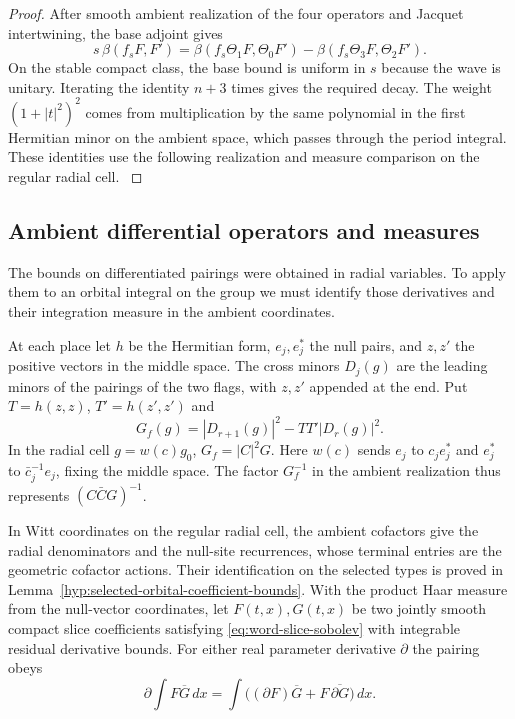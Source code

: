\begin{proof}
After smooth ambient realization of the four operators
and Jacquet intertwining, the base adjoint gives
\[
  s\,\beta(f_s F,F')
   =\beta(f_s\Theta_1 F,\Theta_0 F')
        -\beta(f_s\Theta_3 F,\Theta_2 F').
\]
On the stable compact class, the base bound is uniform in
\(s\) because the wave is unitary. Iterating the identity
\(n+3\) times gives the required decay. The weight
\((1+|t|^2)^2\) comes from multiplication by the same
polynomial in the first Hermitian minor on the ambient
space, which passes through the period integral.
These identities use the following realization and measure
comparison on the regular radial cell. \label{cor:word-pairing-3}

\end{proof}

\subsection{Ambient differential operators and measures}

The bounds on differentiated pairings were obtained in radial variables. To apply them to an orbital integral on the group we must identify those derivatives and their integration measure in the ambient coordinates.

At each place let \(h\) be the Hermitian form, \(e_j,e_j^*\)
the null pairs, and \(z,z'\) the positive vectors in the
middle space. The cross minors \(D_j(g)\) are the leading
minors of the pairings of the two flags, with \(z,z'\)
appended at the end. Put \(T=h(z,z)\), \(T'=h(z',z')\) and
\[
 G_f(g)=|D_{r+1}(g)|^2-TT'|D_r(g)|^2 .
\]
In the radial cell \(g=w(c)g_0\), \(G_f=|C|^2G\).
Here \(w(c)\) sends \(e_j\) to \(c_j e_j^*\) and \(e_j^*\)
to \(\bar c_j^{-1}e_j\), fixing the middle space.
The factor \(G_f^{-1}\) in the ambient realization thus
represents \((C\bar C G)^{-1}\).

\begin{proposition}\label{prop:regular-cell-realization}
In Witt coordinates on the regular radial cell, the ambient
cofactors give the radial denominators and the null-site recurrences,
whose terminal entries are the geometric cofactor actions. Their
identification on the selected types is proved in
Lemma~\ref{hyp:selected-orbital-coefficient-bounds}. With the product Haar
measure from the null-vector coordinates, let \(F(t,x),G(t,x)\) be two jointly smooth compact slice coefficients satisfying \eqref{eq:word-slice-sobolev} with integrable residual derivative bounds. For either real parameter derivative \(\partial\) the pairing obeys 
\[
 \partial\!\int F\overline G\,dx=\int\!\big((\partial F)\overline G+F\,\overline{\partial G}\big)\,dx.
\]

\end{proposition}

